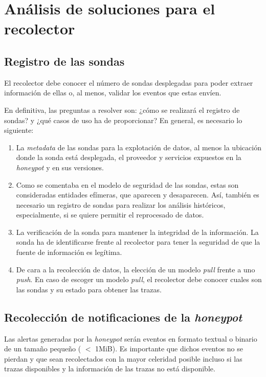 \section{Análisis de soluciones para el recolector}


\subsection{Registro de las sondas}

El recolector debe conocer el número de sondas desplegadas para poder extraer información de ellas o, al menos, validar
los eventos que estas envíen.

En definitiva, las preguntas a resolver son: ¿cómo se realizará el registro de sondas? y ¿qué casos de uso ha de proporcionar? En general, es necesario lo siguiente:

\begin{enumerate}
    \item La \emph{metadata} de las sondas para la explotación de datos, al menos la ubicación donde la sonda está desplegada, el proveedor y servicios expuestos en la \emph{honeypot} y en sus versiones.
    \item Como se comentaba en el modelo de seguridad de las sondas, estas son consideradas entidades efímeras, que aparecen y desaparecen. 
    Así, también es necesario un registro de sondas para realizar los análisis históricos, especialmente, si se quiere permitir el reprocesado de datos.
    \item La verificación de la sonda para mantener la integridad de la información. La sonda ha de identificarse frente al recolector para tener la seguridad de que la fuente de información es legítima.
    \item De cara a la recolección de datos, la elección de un modelo \emph{pull} frente a uno \emph{push}. En caso de escoger un modelo \emph{pull}, el recolector debe conocer
    cuales son las sondas y su estado para obtener las trazas.
\end{enumerate}

\subsection{Recolecci\'on de notificaciones de la \emph{honeypot}}

Las alertas generadas por la \emph{honeypot} serán eventos en formato textual o binario de un tamaño pequeño ( $<$ 1MiB). 
Es importante que dichos eventos no se pierdan y que sean recolectados con la mayor celeridad posible incluso si las trazas disponibles
y la información de las trazas no está disponible.

